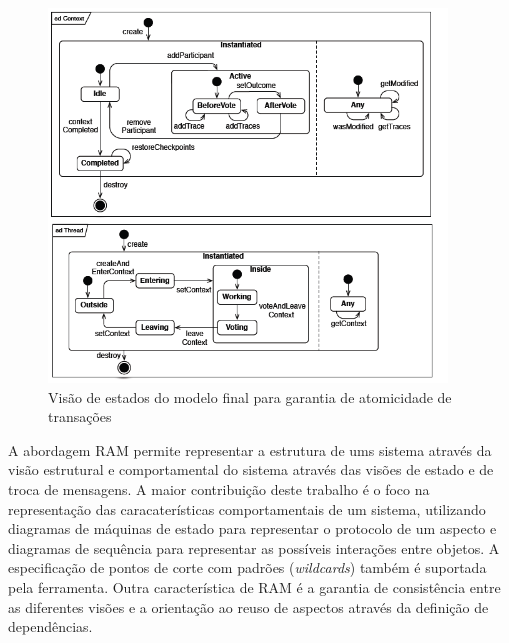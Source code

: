 \begin{landscape}
\begin{figure}
	\centering
	\includegraphics[width=400px]{img/p87_state_final_model.png}
	\caption{Visão de estados do modelo final para garantia de atomicidade de transações}\label{fig:p87_state_final_model}
\end{figure}
\end{landscape}

A abordagem RAM permite representar a estrutura de ums sistema através da visão estrutural e comportamental do sistema através das visões de estado
e de troca de mensagens. A maior contribuição deste trabalho é o foco na representação das caracaterísticas comportamentais de um sistema, utilizando
diagramas de máquinas de estado para representar o protocolo de um aspecto e diagramas de sequência para representar as possíveis interações entre
objetos. A especificação de pontos de corte com padrões (\textit{wildcards}) também é suportada pela ferramenta. Outra característica de RAM é a garantia de consistência entre as
diferentes visões e a orientação ao reuso de aspectos através da definição de dependências. 

